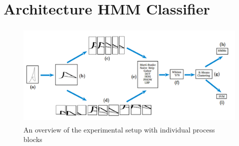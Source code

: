 \documentclass[runningheads]{llncs}
\begin{document}


\section{Architecture HMM Classifier}
\label{sec:HMM}
\begin{figure}[t]

\begin{minipage}[b]{1.0\linewidth}
  \centering
  \centerline{\includegraphics[width=13.0cm,height=5.0cm]{architecture}}
\end{minipage}
\caption{An overview of the experimental setup with individual process blocks}
\label{fig:architecture}
%
\end{figure}
\end{document}
